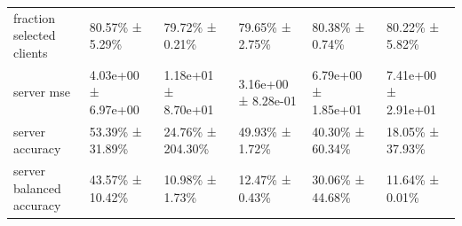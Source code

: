 \begin{tabular}{llllll}
 fraction selected clients          & 80.57\% ± 5.29\%      & 79.72\% ± 0.21\%      & 79.65\% ± 2.75\%      & 80.38\% ± 0.74\%      & 80.22\% ± 5.82\%      \\
 server mse                         & 4.03e+00 ± 6.97e+00 & 1.18e+01 ± 8.70e+01 & 3.16e+00 ± 8.28e-01 & 6.79e+00 ± 1.85e+01 & 7.41e+00 ± 2.91e+01 \\
 server accuracy                    & 53.39\% ± 31.89\%     & 24.76\% ± 204.30\%    & 49.93\% ± 1.72\%      & 40.30\% ± 60.34\%     & 18.05\% ± 37.93\%     \\
 server balanced accuracy           & 43.57\% ± 10.42\%     & 10.98\% ± 1.73\%      & 12.47\% ± 0.43\%      & 30.06\% ± 44.68\%     & 11.64\% ± 0.01\%      \\
\hline
\end{tabular}